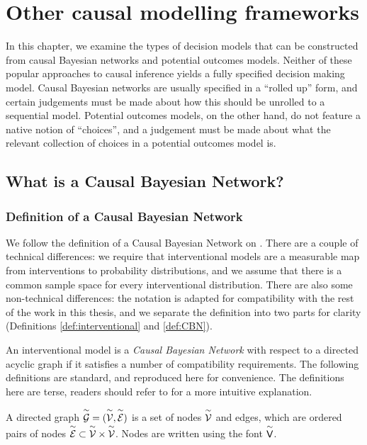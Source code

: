 
\chapter{Other causal modelling frameworks}\label{ch:other_causal_frameworks}

In this chapter, we examine the types of decision models that can be constructed from causal Bayesian networks and potential outcomes models. Neither of these popular approaches to causal inference yields a fully specified decision making model. Causal Bayesian networks are usually specified in a ``rolled up'' form, and certain judgements must be made about how this should be unrolled to a sequential model. Potential outcomes models, on the other hand, do not feature a native notion of ``choices'', and a judgement must be made about what the relevant collection of choices in a potential outcomes model is.

\section{What is a Causal Bayesian Network?}

\subsection{Definition of a Causal Bayesian Network}

We follow the definition of a Causal Bayesian Network on \citet[page ~23-24]{pearl_causality:_2009}. There are a couple of technical differences: we require that interventional models are a measurable map from interventions to probability distributions, and we assume that there is a common sample space for every interventional distribution. There are also some non-technical differences: the notation is adapted for compatibility with the rest of the work in this thesis, and we separate the definition into two parts for clarity (Definitions \ref{def:interventional} and \ref{def:CBN}).

An interventional model is a \emph{Causal Bayesian Network} with respect to a directed acyclic graph if it satisfies a number of compatibility requirements. The following definitions are standard, and reproduced here for convenience. The definitions here are terse, readers should refer to \citet[chap. ~1]{pearl_causality:_2009} for a more intuitive explanation.

\begin{definition}
A directed graph $\overset{\sim}{\mathcal{G}}=(\overset{\sim}{\mathcal{V}},\overset{\sim}{\mathcal{E}})$ is a set of nodes $\overset{\sim}{\mathcal{V}}$ and edges, which are ordered pairs of nodes $\overset{\sim}{\mathcal{E}}\subset \overset{\sim}{\mathcal{V}}\times\overset{\sim}{\mathcal{V}}$. Nodes are written using the font $\overset{\sim}{\mathsf{V}}$.
\end{definition}

